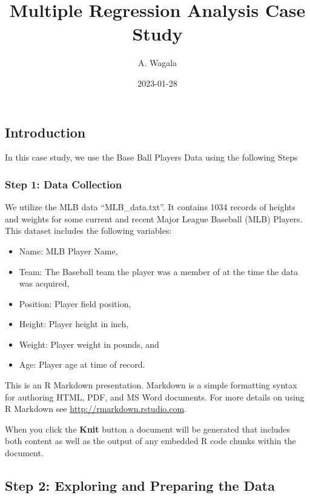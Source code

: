\documentclass[
]{article}
\title{Multiple Regression Analysis Case Study}
\author{A. Wagala}
\date{2023-01-28}
\providecommand{\tightlist}{%
  \setlength{\itemsep}{0pt}\setlength{\parskip}{0pt}}
\begin{document}
\maketitle

\hypertarget{introduction}{%
\subsection{Introduction}\label{introduction}}

In this case study, we use the Base Ball Players Data using the
following Steps

\hypertarget{step-1-data-collection}{%
\subsubsection{Step 1: Data Collection}\label{step-1-data-collection}}

We utilize the MLB data ``MLB\_data.txt''. It contains 1034 records of
heights and weights for some current and recent Major League Baseball
(MLB) Players. This dataset includes the following variables:

\begin{itemize}
\tightlist
\item
  Name: MLB Player Name,
\item
  Team: The Baseball team the player was a member of at the time the
  data was acquired,
\item
  Position: Player field position,
\item
  Height: Player height in inch,
\item
  Weight: Player weight in pounds, and
\item
  Age: Player age at time of record.
\end{itemize}

This is an R Markdown presentation. Markdown is a simple formatting
syntax for authoring HTML, PDF, and MS Word documents. For more details
on using R Markdown see \url{http://rmarkdown.rstudio.com}.

When you click the \textbf{Knit} button a document will be generated
that includes both content as well as the output of any embedded R code
chunks within the document.

\hypertarget{step-2-exploring-and-preparing-the-data}{%
\subsection{Step 2: Exploring and Preparing the
Data}\label{step-2-exploring-and-preparing-the-data}}
\end{document}
